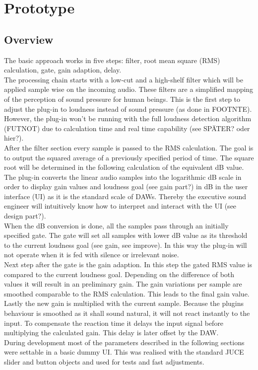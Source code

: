 \chapter{Prototype}
\label{chapter:prototype}

\section{Overview}

The basic approach works in five steps: filter, root mean square (RMS) calculation, gate, gain adaption, delay.\\
The processing chain starts with a low-cut and a high-shelf filter which will be applied sample wise on the incoming audio. These filters are a simplified mapping of the perception of sound pressure for human beings. This is the first step to adjust the plug-in to loudness instead of sound pressure (as done in FOOTNTE). However, the plug-in won’t be running with the full loudness detection algorithm (FUTNOT) due to calculation time and real time capability (see SPÄTER? oder hier?).\\
After the filter section every sample is passed to the RMS calculation.  The goal is to output the squared average of a previously specified period of time. The square root will be determined in the following calculation of the equivalent dB value. The plug-in converts the linear audio samples into the logarithmic dB scale in order to display gain values and loudness goal (see gain part?) in dB in the user interface (UI) as it is the standard scale of DAWs. Thereby the executive sound engineer will intuitively know how to interpret and interact with the UI (see design part?).\\
When the dB conversion is done, all the samples pass through an initially specified gate. The gate will set all samples with lower dB value as its threshold to the current loudness goal (see gain, see improve). In this way the plug-in will not operate when it is fed with silence or irrelevant noise.\\
Next step after the gate is the gain adaption. In this step the gated RMS value is compared to the current loudness goal. Depending on the difference of both values it will result in an preliminary gain. The gain variations per sample are smoothed comparable to the RMS calculation. This leads to the final gain value.\\
Lastly the new gain is multiplied with the current sample. Because the plugins behaviour is smoothed as it shall sound natural, it will not react instantly to the input. To compensate the reaction time it delays the input signal before multiplying the calculated gain. This delay is later offset by the DAW.\\ 
During development most of the parameters described in the following sections were settable in a basic dummy UI. This was realised with the standard JUCE slider and button objects and used for tests and fast adjustments.\\

